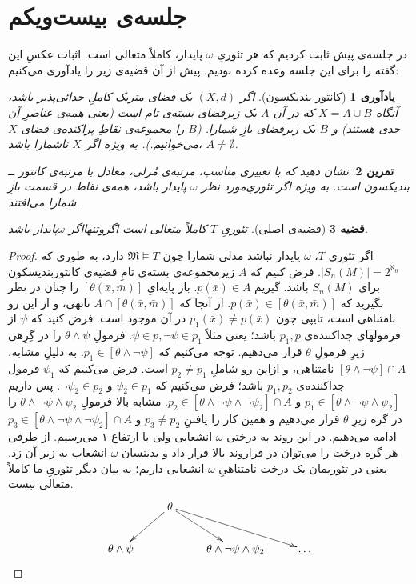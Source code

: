 \documentclass[12pt,a4paper]{report}
\theoremstyle{colorhead}
\newtheorem{thm}{قضیه}
\newtheorem{tam}[thm]{تمرین}
\newtheorem{yad}[thm]{یادآوری}
\begin{document}
\section{جلسه‌ی بیست‌ویکم}
در جلسه‌ی پیش ثابت کردیم که هر تئوریِ
$\omega$
پایدار، کاملاً متعالی است. اثبات عکسِ این گفته را برای این جلسه وعده کرده‌ بودیم. پیش از آن قضیه‌ی زیر را یادآوری می‌کنیم:
\begin{yad}[کانتور بندیکسون]
اگر
$(X,d)$
یک فضای متریک کاملِ جدائی‌پذیر باشد، آنگاه 
$X=A\cup B$
که در آن
$A$
یک زیرفضای بسته‌ی تام است (یعنی همه‌ی عناصرِ آن حدی هستند) و 
$B$
یک زیرفضای بازِ شمارا. ($B$ را مجموعه‌ی نقاطِ پراکنده‌ی فضای
$X$
می‌خوانیم.).  به ویژه اگر
$X$
ناشمارا باشد،
$A\not=\emptyset$.
\end{yad}
\begin{tam}
نشان دهید که با تعبیری مناسب، مرتبه‌ی مُرلی، معادل با مرتبه‌ی کانتور ــ‌ بندیکسون است. به ویژه اگر تئوریِ‌مورد نظر
$\omega$
پایدار باشد، همه‌ی نقاط در قسمت بازِ شمارا می‌افتند. 
\end{tam}
\begin{thm}[قضیه‌ی اصلی]
تئوریِ
$T$
کاملاً متعالی است اگروتنهااگر
$\omega$پایدار 
باشد. 
\end{thm}
\begin{proof}
اگر تئوری $T$، 
$\omega$
پایدار نباشد مدلی شمارا چون
$\mathfrak{M}\models T$
دارد،‌ به طوری که 
\mbox{$|S_n(M)|=2^{\aleph_0}$}.
فرض کنیم که 
$A$
زیرمجموعه‌ی بسته‌ی تامِ  قضیه‌ی کانتوربندیسکون برای
$S_n(M)$
باشد. گیریم
$p(\bar{x})\in A$.
باز پایه‌ایِ
$[\theta(\bar{x}, \bar{m})]$
را چنان در نظر بگیرید که 
\mbox{$p(\bar{x})\in [\theta(\bar{x},\bar{m})]$}.
از آنجا که 
$A\cap [\theta(\bar{x},\bar{m})]$
ناتهی،‌ و از این رو
نامتناهی است، تایپی چون
$p_1(\bar{x})\not=p(\bar{x})$
در آن موجود است. 
فرض کنید که
$\psi$
از فرمولهای
جداکننده‌ی
$p_1,p$
باشد؛ یعنی مثلاً
$\psi\in p,\neg \psi\in p_1$.
فرمولِ
$\theta\wedge\psi$
را در گِرِهی زیرِ فرمولِ
$\theta$
قرار می‌دهیم. توجه می‌کنیم که
$p_1\in [\theta\wedge\neg \psi]$.
به دلیلِ مشابه،
$[\theta\wedge\neg \psi]\cap A$
نامتناهی، و ازاین رو شاملِ
$p_2\not=p_1$
است. فرض می‌کنیم که 
$\psi_1$
فرمول جداکننده‌ی
$p_1,p_2$
باشد؛ فرض می‌کنیم که 
$\psi_2\in p_1$
و
$\neg \psi_2\in p_2$.
پس داریم
$p_1\in [\theta\wedge\neg \psi\wedge\psi_2]$
و
$p_2\in [\theta\wedge\neg \psi\wedge\neg \psi_2]\cap A$.
مشابه‌ بالا فرمولِ
$\theta\wedge\neg \psi\wedge\psi_2$
را در گره زیرِ
$\theta$
قرار می‌دهیم و همین کار را یافتنِ
$p_3\not=p_2$
و 
$p_3\in [\theta\wedge\neg \psi\wedge\neg \psi_2]\cap A$
ادامه می‌دهیم. در این روند به درختی 
$\omega$
انشعابی ولی با ارتفاع ۱ می‌رسیم. از طرفی هر گره‌ درخت را می‌توان در فراروند بالا قرار داد و بدینسان
$\omega$
انشعاب به زیر آن زد. یعنی در تئوریمان یک درخت نامتناهیِ
$\omega$
انشعابی داریم؛ به بیان دیگر تئوریِ ما کاملاً متعالی نیست. 
\[
\xymatrix{
&\theta\ar[dl]\ar[dr]\ar[drr]&\\
\theta\wedge\psi&&\theta\wedge\neg\psi\wedge\psi_2& \ldots
}
\]
\end{proof}
\end{document}
